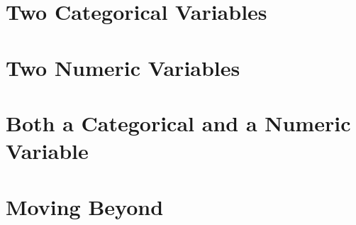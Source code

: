 \documentclass[a4paper, captions=tableheading]{tufte-book}
\begin{document}
\section{Two Categorical Variables}
\label{sec:orgheadline11}

\section{Two Numeric Variables}
\label{sec:orgheadline12}

\section{Both a Categorical and a Numeric Variable}
\label{sec:orgheadline13}

\section{Moving Beyond}
\label{sec:orgheadline14}
\end{document}
